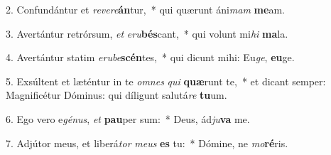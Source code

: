 2. Confundántur et \textit{re}\textit{ve}\textit{re}\textbf{án}tur,~*  qui quærunt áni\textit{mam} \textbf{me}am.\

3. Avertántur retrórsum, \textit{et} \textit{e}\textit{ru}\textbf{bés}cant,~*  qui volunt mi\textit{hi} \textbf{ma}la.\

4. Avertántur statim \textit{e}\textit{ru}\textit{be}\textbf{scén}tes,~*  qui dicunt mihi: Eu\textit{ge}, \textbf{eu}ge.\

5. Exsúltent et læténtur in te \textit{om}\textit{nes} \textit{qui} \textbf{quæ}runt te,~*  et dicant semper: Magnificétur Dóminus: qui díligunt salutá\textit{re} \textbf{tu}um.\

6. Ego vero e\textit{gé}\textit{nus}, \textit{et} \textbf{pau}per sum:~*  Deus, ád\textit{ju}\textbf{va} me.\

7. Adjútor meus, et liberá\textit{tor} \textit{me}\textit{us} \textbf{es} tu:~*  Dómine, ne \textit{mo}\textbf{ré}ris.\


